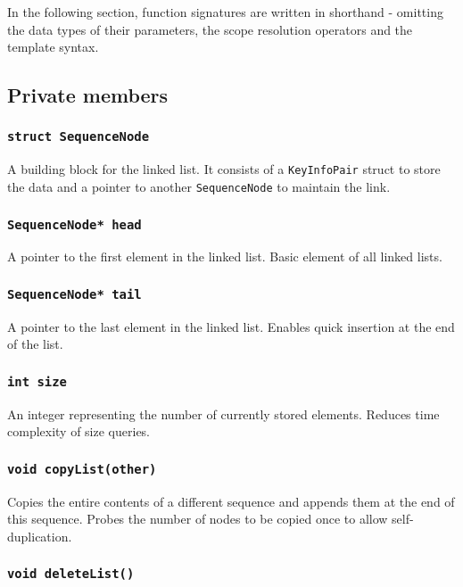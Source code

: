 ﻿\documentclass{article}
\begin{document}
In the following section, function signatures are written in shorthand -
omitting the data types of their parameters, the scope resolution operators and
the template syntax.

\subsection{Private members}

\subsubsection{{\tt struct SequenceNode}}

A building block for the linked list. It consists of a {\tt KeyInfoPair} struct
to store the data and a pointer to another {\tt SequenceNode} to maintain the
link.

\subsubsection{{\tt SequenceNode* head}}

A pointer to the first element in the linked list. Basic element of all linked
lists.

\subsubsection{{\tt SequenceNode* tail}}

A pointer to the last element in the linked list. Enables quick insertion at the
end of the list.

\subsubsection{{\tt int size}}

An integer representing the number of currently stored elements. Reduces time
complexity of size queries.

\subsubsection{{\tt void copyList(other)}}

Copies the entire contents of a different sequence and appends them at the end
of this sequence. Probes the number of nodes to be copied once to allow
self-duplication.

\subsubsection{{\tt void deleteList()}}
\end{document}
